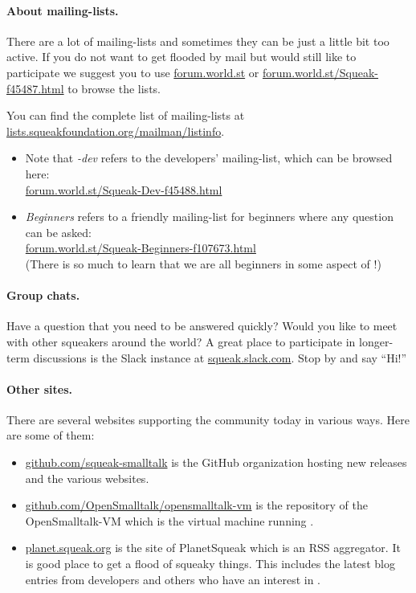 \documentclass[a4paper,10pt,twoside]{book}
\begin{document}
\paragraph{About mailing-lists.} There are a lot of mailing-lists and sometimes they can be just a little bit too active. If you do not want to get flooded by mail but would still like to participate we suggest you to use \url{forum.world.st} or \url{forum.world.st/Squeak-f45487.html} to browse the lists.

You can find the complete list of \sq mailing-lists at \url{lists.squeakfoundation.org/mailman/listinfo}.

\begin{itemize}
\item Note that \emph{\sq-dev} refers to the developers' mailing-list, which can be browsed here:\\
\url{forum.world.st/Squeak-Dev-f45488.html}
\item \emph{Beginners} refers to a friendly mailing-list for beginners where any question can be asked:\\
\url{forum.world.st/Squeak-Beginners-f107673.html}\\
(There is so much to learn that we are all beginners in some aspect of \sq!)
\end{itemize}

\paragraph{Group chats.}
Have a question that you need to be answered quickly?
Would you like to meet with other squeakers around the world?
A great place to participate in longer-term discussions is the Slack instance at \url{squeak.slack.com}.
Stop by and say ``Hi!''

\paragraph{Other sites.} There are several websites supporting the \sq community today in various ways.
Here are some of them:
\begin{itemize}
  \item \url{github.com/squeak-smalltalk} is the GitHub organization hosting new releases and the various \sq websites.
	
  \item \url{github.com/OpenSmalltalk/opensmalltalk-vm} is the repository of the OpenSmalltalk-VM which is the virtual machine running \sq.

  \item \url{planet.squeak.org} is the site of PlanetSqueak which is an RSS aggregator. It is good place to get a flood of squeaky things. This includes the latest blog entries from developers and others who have an interest in \sq.
\end{itemize}
\end{document}
